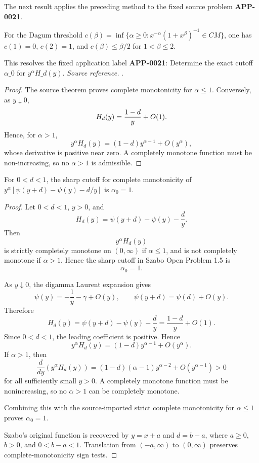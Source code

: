The next result applies the preceding method to the fixed source problem \textbf{APP-0021}.
\begin{corollary}[APP-0021: Szabo's cutoff problem has \(\alpha\_0=1\)]
\label{res:dagum-c-endpoints-and-upper-gate}
For the Dagum threshold \(c(\beta)=\inf\{\alpha\ge0:x^{-\alpha}(1+x^\beta)^{-1}\in CM\}\), one has \(c(1)=0\), \(c(2)=1\), and \(c(\beta)\le\beta/2\) for \(1<\beta\le2\).

This resolves the fixed application label \textbf{APP-0021}: Determine the exact cutoff \(\alpha\_0\) for \(y^\alpha H\_d(y)\).
\emph{Source reference.} \cite{app-app-0021-source}.
\end{corollary}
\begin{proof}
The source theorem proves complete monotonicity for \(\alpha\le1\).  Conversely,
as \(y\downarrow0\),
\[
  H_d(y)={1-d\over y}+O(1).
\]
Hence, for \(\alpha>1\),
\[
  y^\alpha H_d(y)=(1-d)y^{\alpha-1}+O(y^\alpha),
\]
whose derivative is positive near zero.  A completely monotone function must be
non-increasing, so no \(\alpha>1\) is admissible.
\end{proof}

\begin{proposition}
\label{res:szabo-psi-difference-alpha0-exact-one}
For \(0<d<1\), the sharp cutoff for complete monotonicity of \(y^\alpha[\psi(y+d)-\psi(y)-d/y]\) is \(\alpha_0=1\).
\end{proposition}
\begin{proof}
Let \(0<d<1\), \(y>0\), and
\[
H_d(y)=\psi(y+d)-\psi(y)-\frac{d}{y}.
\]
Then
\[
y^\alpha H_d(y)
\]
is strictly completely monotone on \((0,\infty)\) if \(\alpha\le 1\), and is not completely monotone if \(\alpha>1\). Hence the sharp cutoff in Szabo Open Problem 1.5 is
\[
\alpha_0=1.
\]

As \(y\downarrow0\), the digamma Laurent expansion gives
\[
\psi(y)=-\frac1y-\gamma+O(y),
\qquad
\psi(y+d)=\psi(d)+O(y).
\]
Therefore
\[
H_d(y)=\psi(y+d)-\psi(y)-\frac{d}{y}
=\frac{1-d}{y}+O(1).
\]
Since \(0<d<1\), the leading coefficient is positive. Hence
\[
y^\alpha H_d(y)=(1-d)y^{\alpha-1}+O(y^\alpha).
\]
If \(\alpha>1\), then
\[
\frac{d}{dy}\left(y^\alpha H_d(y)\right)
=(1-d)(\alpha-1)y^{\alpha-2}+O(y^{\alpha-1})>0
\]
for all sufficiently small \(y>0\). A completely monotone function must be nonincreasing, so no \(\alpha>1\) can be completely monotone.

Combining this with the source-imported strict complete monotonicity for \(\alpha\le1\) proves \(\alpha_0=1\).

Szabo's original function is recovered by \(y=x+a\) and \(d=b-a\), where \(a\ge0\), \(b>0\), and \(0<b-a<1\). Translation from \((-a,\infty)\) to \((0,\infty)\) preserves complete-monotonicity sign tests.
\end{proof}

